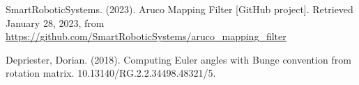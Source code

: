 \begin{flushleft}
\begin{thebibliography}{19}














 SmartRoboticSystems. (2023). Aruco Mapping Filter [GitHub project]. Retrieved January 28, 2023, from \url{https://github.com/SmartRoboticSystems/aruco_mapping_filter}

Depriester, Dorian. (2018). Computing Euler angles with Bunge convention from rotation matrix. 10.13140/RG.2.2.34498.48321/5.


\end{thebibliography}

\end{flushleft}
